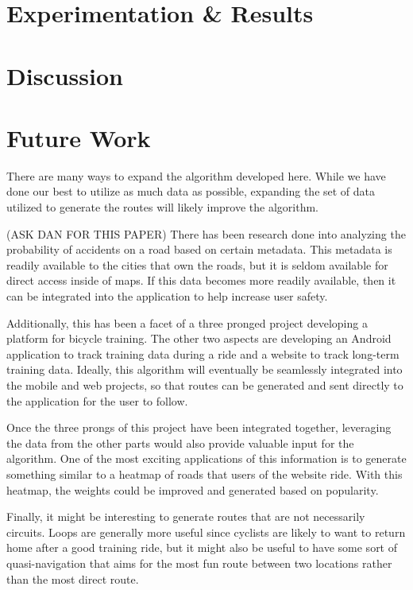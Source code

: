 \documentclass[twocolumn,11pt]{article}
\begin{document}
\section{Experimentation \& Results}

\section{Discussion}

\section{Future Work}

There are many ways to expand the algorithm developed here. While we have done
our best to utilize as much data as possible, expanding the set of data utilized
to generate the routes will likely improve the algorithm.


 (ASK DAN FOR THIS
PAPER) There has been research done into analyzing the probability of accidents
on a road based on certain metadata. This metadata is readily available to the
cities that own the roads, but it is seldom available for direct access inside
of maps. If this data becomes more readily available, then it can be integrated
into the application to help increase user safety.

Additionally, this has been a facet of a three pronged project developing a
platform for bicycle training. The other two aspects are developing an Android
application to track training data during a ride and a website to track
long-term training data. Ideally, this algorithm will eventually be seamlessly
integrated into the mobile and web projects, so that routes can be generated
and sent directly to the application for the user to follow.

Once the three prongs of this project have been integrated together, leveraging
the data from the other parts would also provide valuable input for the
algorithm. One of the most exciting applications of this information is to
generate something similar to a heatmap of roads that users of the website
ride. With this heatmap, the weights could be improved and generated based on
popularity.

Finally, it might be interesting to generate routes that are not necessarily
circuits. Loops are generally more useful since cyclists are likely to want
to return home after a good training ride, but it might also be useful to
have some sort of quasi-navigation that aims for the most fun route
between two locations rather than the most direct route.
\end{document}
